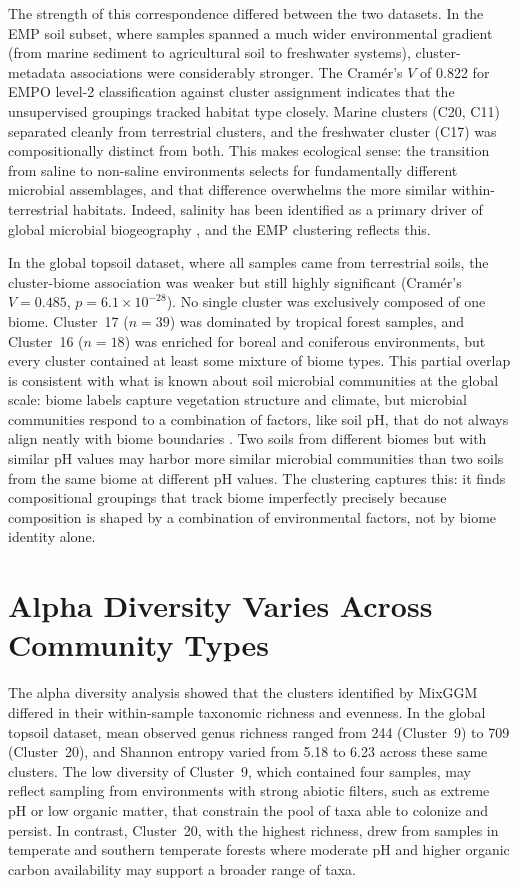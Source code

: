 \documentclass[12pt, oneside]{report}
\begin{document}
The strength of this correspondence differed between the two datasets. In the EMP soil subset,
where samples spanned a much wider environmental gradient (from marine sediment to
agricultural soil to freshwater systems), cluster-metadata associations were considerably
stronger. The Cram\'{e}r's $V$ of 0.822 for EMPO level-2 classification against cluster
assignment indicates that the unsupervised groupings tracked habitat type closely. Marine
clusters (C20, C11) separated cleanly from terrestrial clusters, and the freshwater cluster
(C17) was compositionally distinct from both. This makes ecological sense: the transition
from saline to non-saline environments selects for fundamentally different microbial
assemblages, and that difference overwhelms the more similar within-terrestrial habitats.
Indeed, salinity has been identified as a primary driver of global microbial biogeography
\cite{lozupone2007}, and the EMP clustering reflects this.

In the global topsoil dataset, where all samples came from terrestrial soils, the
cluster-biome association was weaker but still highly significant (Cram\'{e}r's
$V = 0.485$, $p = 6.1 \times 10^{-28}$). No single cluster was exclusively composed of
one biome. Cluster~17 ($n = 39$) was dominated by tropical forest samples, and Cluster~16
($n = 18$) was enriched for boreal and coniferous environments, but every cluster contained
at least some mixture of biome types. This partial overlap is consistent with what is known
about soil microbial communities at the global scale: biome labels capture vegetation
structure and climate, but microbial communities respond to a combination of factors,
like soil pH, that do not always align neatly with biome boundaries
\cite{fierer2006,lauber2009}. Two soils
from different biomes but with similar pH values may harbor more similar microbial
communities than two soils from the same biome at different pH values. The clustering
captures this: it finds compositional groupings that track biome imperfectly precisely
because composition is shaped by a combination of environmental factors, not by biome
identity alone.

\section{Alpha Diversity Varies Across Community Types}
\label{disc:alpha}

The alpha diversity analysis showed that the clusters identified by MixGGM differed in
their within-sample taxonomic richness and evenness. In the global topsoil dataset, mean
observed genus richness ranged from 244 (Cluster~9) to 709 (Cluster~20), and Shannon
entropy varied from 5.18 to 6.23 across these same clusters. The low diversity of
Cluster~9, which contained four samples, may reflect sampling from environments with
strong abiotic filters, such as extreme pH or low organic matter, that constrain the pool
of taxa able to colonize and persist. In contrast, Cluster~20, with the highest richness,
drew from samples in temperate and southern temperate forests where moderate pH and higher
organic carbon availability may support a broader range of taxa.
\end{document}
